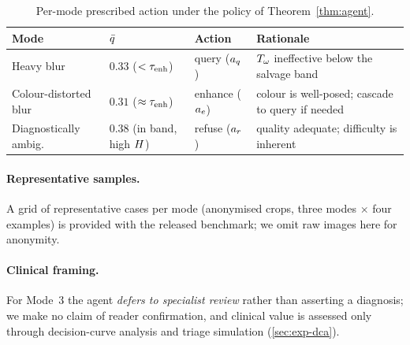 \begin{table}[t]
\centering
\caption{Per-mode prescribed action under the policy of Theorem~\ref{thm:agent}.}
\label{tab:failure-mitigation}
\begin{tabular}{llll}
\toprule
Mode & $\bar{q}$ & Action & Rationale \\
\midrule
Heavy blur            & $0.33$ ($<\tau_{\mathrm{enh}}$)        & query ($a_q$)   & $T_\omega$ ineffective below the salvage band \\
Colour-distorted blur & $0.31$ ($\approx\tau_{\mathrm{enh}}$)  & enhance ($a_e$) & colour is well-posed; cascade to query if needed \\
Diagnostically ambig. & $0.38$ (in band, high $H$) & refuse ($a_r$) & quality adequate; difficulty is inherent \\
\bottomrule
\end{tabular}
\end{table}

\paragraph{Representative samples.}
A grid of representative cases per mode (anonymised crops, three modes $\times$ four examples) is
provided with the released benchmark; we omit raw images here for anonymity.

\paragraph{Clinical framing.}
For Mode~3 the agent \emph{defers to specialist review} rather than asserting a diagnosis; we make no
claim of reader confirmation, and clinical value is assessed only through decision-curve analysis and
triage simulation (\cref{sec:exp-dca}).
